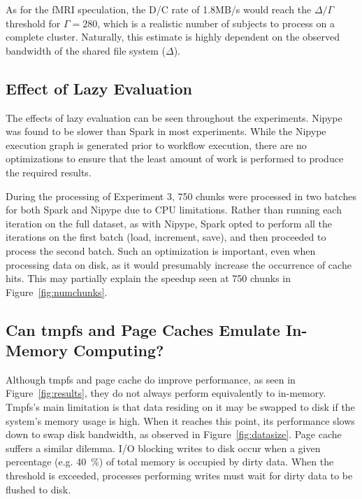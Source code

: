 As for the fMRI speculation, the D/C 
rate of 1.8MB/s would reach the $\Delta/\Gamma$ threshold for 
$\Gamma=280$, which is a realistic number of subjects to process on a 
complete cluster. Naturally, this estimate is highly dependent on the observed bandwidth
of the shared file system ($\Delta$).

\subsection{Effect of Lazy Evaluation}

The effects of lazy evaluation can be seen throughout the experiments. Nipype 
was found to be slower than Spark in most experiments. While the Nipype execution
graph is 
generated prior to workflow execution, there are no optimizations
to ensure that the least amount of work is performed to produce the required 
results. 

During the processing of Experiment 3, 750 chunks were processed in two batches
for both Spark and Nipype due to CPU limitations.
Rather than running each iteration on the full dataset, as with Nipype, 
Spark opted to perform all the iterations on the first batch (load, increment, save),
and then proceeded to process the second batch. Such an optimization is important, 
even when processing data on disk, as it would presumably increase the occurrence
of cache hits. This may partially explain the speedup seen at 750 chunks in
Figure~\ref{fig:numchunks}.%

\subsection{Can tmpfs and Page Caches Emulate In-Memory Computing?}

Although tmpfs and page cache do improve performance, as seen in
Figure~\ref{fig:results}, they do not always perform equivalently to in-memory. 
Tmpfs's main limitation is that data residing on it may be swapped to disk if 
the system's memory usage is high. When it reaches this point, its performance 
slows down to swap disk bandwidth, as observed in Figure~\ref{fig:datasize}. Page cache suffers a similar dilemma. I/O blocking writes to disk occur when a given percentage (e.g. 40~\%)
of total memory is occupied by dirty data. When the threshold is exceeded,
processes performing writes must wait for dirty data to be flushed to disk.

